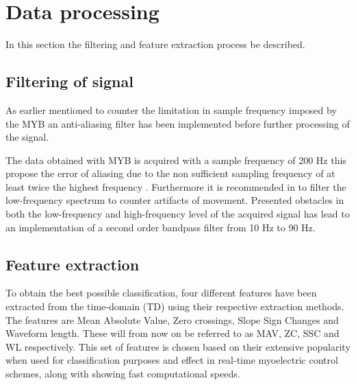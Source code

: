 

\section{Data processing}

In this section the filtering and feature extraction process be described.

\subsection{Filtering of signal} \label{sec:prePros} 

As earlier mentioned to counter the limitation in sample frequency imposed by the MYB an anti-aliasing filter has been implemented before further processing of the signal.  


The data obtained with MYB is acquired with a sample frequency of 200 Hz this propose the error of aliasing due to the non sufficient sampling frequency of at least twice the highest frequency \cite{Pozzo2004}. Furthermore it is recommended in \cite{DeLuca2010} to filter the low-frequency spectrum to counter artifacts of movement. Presented obstacles in both the low-frequency and high-frequency level of the acquired signal has lead to an implementation of a second order bandpass filter from 10 Hz to 90 Hz.   





\subsection{Feature extraction}

To obtain the best possible classification, four different features have been extracted from the time-domain (TD) using their respective extraction methods. The features are Mean Absolute Value, Zero crossings, Slope Sign Changes and Waveform length. These will from now on be referred to as MAV, ZC, SSC and WL respectively. This set of features is chosen based on their extensive popularity when used for classification purposes and effect in real-time myoelectric control schemes, along with showing fast computational speeds.\cite{Hudgins1993, Kamavuako2016, Scheme2010}


